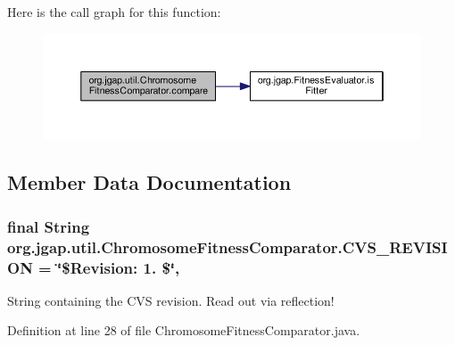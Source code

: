 Here is the call graph for this function\-:
\nopagebreak
\begin{figure}[H]
\begin{center}
\leavevmode
\includegraphics[width=350pt]{classorg_1_1jgap_1_1util_1_1_chromosome_fitness_comparator_a690f397bbe843f98c2c875f7e0aae36d_cgraph}
\end{center}
\end{figure}




\subsection{Member Data Documentation}
\hypertarget{classorg_1_1jgap_1_1util_1_1_chromosome_fitness_comparator_a32b7298f77b4def1cc350d085f9647d4}{
\subsubsection[{C\-V\-S\-\_\-\-R\-E\-V\-I\-S\-I\-O\-N}]{\setlength{\rightskip}{0pt plus 5cm}final String org.\-jgap.\-util.\-Chromosome\-Fitness\-Comparator.\-C\-V\-S\-\_\-\-R\-E\-V\-I\-S\-I\-O\-N = \char`\"{}\$Revision\-: 1. \$\char`\"{}\hspace{0.3cm}{\ttfamily [static]}, {\ttfamily [private]}}}\label{classorg_1_1jgap_1_1util_1_1_chromosome_fitness_comparator_a32b7298f77b4def1cc350d085f9647d4}
String containing the C\-V\-S revision. Read out via reflection! 

Definition at line 28 of file Chromosome\-Fitness\-Comparator.\-java.

